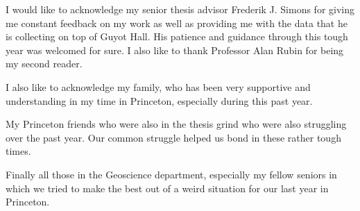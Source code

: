 

I would like to acknowledge my senior thesis advisor Frederik J. Simons for giving me constant feedback on my work as well as providing me with the data that he is collecting on top of Guyot Hall. His patience and guidance through this tough year was welcomed for sure. I also like to thank Professor Alan Rubin for being my second reader. 

I also like to acknowledge my family, who has been very supportive and understanding in my time in Princeton, especially during this past year. 

My Princeton friends who were also in the thesis grind who were also struggling over the past year. Our common struggle helped us bond in these rather tough times. 

Finally all those in the Geoscience department, especially my fellow seniors in which we tried to make the best out of a weird situation for our last year in Princeton. 